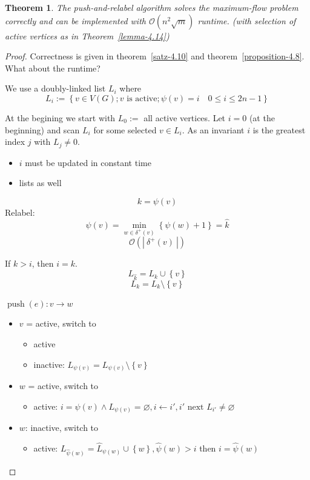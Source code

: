 \documentclass{article}
\newtheorem{theorem}{Theorem}
\newcommand{\card}[1]{\left|\:\!#1\:\!\right|}
\newcommand{\set}[1]{\left\{#1\right\}}
\DeclareMathOperator{\push}{push}
\begin{document}
\begin{theorem}\label{satz-4.15}
  The push-and-relabel algorithm solves the maximum-flow problem correctly and can be implemented with $\mathcal{O}(n^2 \sqrt{m})$ runtime.
  (with selection of active vertices as in Theorem~\ref{lemma-4.14})
\end{theorem}

\begin{proof}
  Correctness is given in theorem~\ref{satz-4.10} and theorem~\ref{proposition-4.8}. What about the runtime?

  We use a doubly-linked list $L_i$ where
  \[
    L_i := \set{v \in V(G); v \text{ is active}; \psi(v) = i \quad 0 \leq i \leq 2n - 1}
  \]

  At the begining we start with $L_0 := $ all active vertices.
  Let $i = 0$ (at the beginning) and scan $L_i$ for some selected $v \in L_i$.
  As an invariant $i$ is the greatest index $j$ with $L_j \neq 0$.

  \begin{itemize}
    \item $i$ must be updated in constant time
    \item lists as well
  \end{itemize}

  \[ k = \psi(v) \]
  Relabel: \[ \psi(v) = \min_{w\in\delta^+(v)}{\set{\psi(w) + 1}} = \hat k \]
  \[ \mathcal{O}(\card{\delta^+(v)}) \]

  If $k > i$, then $i = k$.
  \[ L_{\hat k} = L_k \cup \set{v} \]
  \[ L_k = L_k \setminus \set{v} \]

  $\push(e): v \rightarrow w$
  \begin{itemize}
    \item $v$ = active, switch to
      \begin{itemize}
        \item active
        \item inactive: $L_{\psi(v)} = L_{\psi(v)} \setminus \set{v}$
      \end{itemize}
    \item $w$ = active, switch to
      \begin{itemize}
        \item active: $i = \psi(v) \land L_{\psi(v)} = \diameter, i \leftarrow i', i' \text{ next } L_{i'} \neq \diameter$
      \end{itemize}
    \item $w$: inactive, switch to
      \begin{itemize}
        \item active: $L_{\hat \psi(w)} = \hat L_{\psi(w)} \cup \set{w}, \hat\psi(w) > i$ then $i = \hat\psi(w)$
      \end{itemize}
  \end{itemize}


\end{proof}
\end{document}
